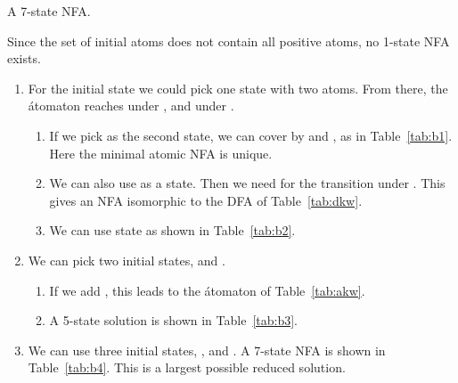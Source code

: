 \documentclass{llncs}
\newcommand{\be}{\begin{enumerate}}
\newcommand{\ee}{\end{enumerate}}
\newcommand{\qedb}{\hfill}
\begin{document}
\begin{example}
\begin{table}[t]
\begin{minipage}[b]{0.45\linewidth}
\begin{center}
\end{center}
\end{minipage}
\hspace{.4cm}
\begin{minipage}[b]{0.45\linewidth}
\caption{A 7-state NFA.}
\label{tab:b4}
\begin{center}

\end{center}
\end{minipage}
\end{table}

Since the set  of initial atoms does not contain all positive atoms, no 1-state NFA exists.
\be
\item 
For the initial state we could pick one state  with two atoms.  From there, the \'atomaton reaches 
 under , and   under . 
        \be
        \item
If we pick 
as the second state,  we can cover  by  and 
, as  in Table~\ref{tab:b1}.
Here the minimal atomic NFA is unique.
        \item
        We can also use  as a state. Then we need 
        for the transition under . This gives an NFA  isomorphic to the DFA of Table~\ref{tab:dkw}.
        \item
        We can use state 
        as shown in Table~\ref{tab:b2}.
        \ee
\item
We can pick two initial states,  and . 
        \be
        \item
        If we add , this leads to the  \'atomaton of Table~\ref{tab:akw}.
        \item
        A 5-state solution is shown in Table~\ref{tab:b3}.
        \ee
\item
We can use three initial states, ,  and . 
        A 7-state NFA is shown in  Table~\ref{tab:b4}. This 
           is a largest possible reduced solution.\qedb
\ee

\end{example}
\end{document}
